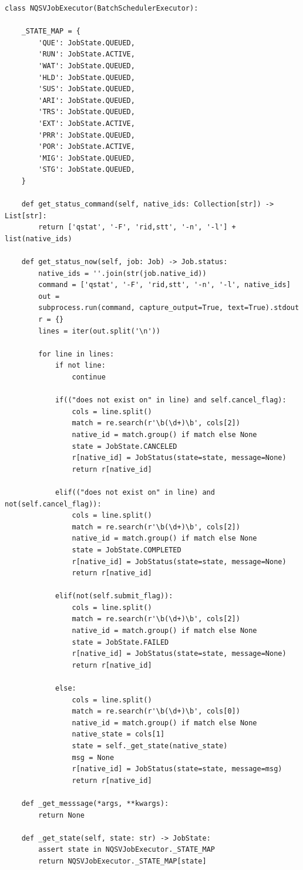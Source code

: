 \begin{lstlisting}[caption=ジョブの状態取得メソッド, label=get_status_now]
class NQSVJobExecutor(BatchSchedulerExecutor):

    _STATE_MAP = {
        'QUE': JobState.QUEUED,
        'RUN': JobState.ACTIVE,
        'WAT': JobState.QUEUED,
        'HLD': JobState.QUEUED,
        'SUS': JobState.QUEUED,
        'ARI': JobState.QUEUED,
        'TRS': JobState.QUEUED,
        'EXT': JobState.ACTIVE,
        'PRR': JobState.QUEUED,
        'POR': JobState.ACTIVE,
        'MIG': JobState.QUEUED,
        'STG': JobState.QUEUED, 
    }

    def get_status_command(self, native_ids: Collection[str]) -> List[str]:
        return ['qstat', '-F', 'rid,stt', '-n', '-l'] + list(native_ids) 

    def get_status_now(self, job: Job) -> Job.status:
        native_ids = ''.join(str(job.native_id))
        command = ['qstat', '-F', 'rid,stt', '-n', '-l', native_ids]
        out = 
        subprocess.run(command, capture_output=True, text=True).stdout
        r = {}
        lines = iter(out.split('\n'))

        for line in lines:
            if not line:
                continue      

            if(("does not exist on" in line) and self.cancel_flag):
                cols = line.split()
                match = re.search(r'\b(\d+)\b', cols[2])
                native_id = match.group() if match else None
                state = JobState.CANCELED
                r[native_id] = JobStatus(state=state, message=None)
                return r[native_id]
            
            elif(("does not exist on" in line) and not(self.cancel_flag)):
                cols = line.split()
                match = re.search(r'\b(\d+)\b', cols[2])
                native_id = match.group() if match else None
                state = JobState.COMPLETED
                r[native_id] = JobStatus(state=state, message=None)
                return r[native_id]

            elif(not(self.submit_flag)):
                cols = line.split()
                match = re.search(r'\b(\d+)\b', cols[2])
                native_id = match.group() if match else None
                state = JobState.FAILED
                r[native_id] = JobStatus(state=state, message=None)
                return r[native_id]
            
            else:
                cols = line.split()
                match = re.search(r'\b(\d+)\b', cols[0])
                native_id = match.group() if match else None
                native_state = cols[1]
                state = self._get_state(native_state)
                msg = None
                r[native_id] = JobStatus(state=state, message=msg)
                return r[native_id]
    
    def _get_messsage(*args, **kwargs):  
        return None
    
    def _get_state(self, state: str) -> JobState: 
        assert state in NQSVJobExecutor._STATE_MAP
        return NQSVJobExecutor._STATE_MAP[state]
\end{lstlisting}



